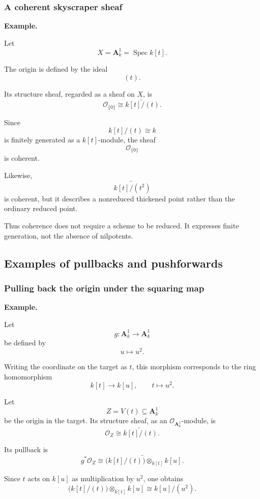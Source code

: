 \subsubsection{A coherent skyscraper sheaf}

\textbf{Example.}

Let
\[
X=\mathbf A^1_k=\operatorname{Spec}k[t].
\]

The origin is defined by the ideal
\[
(t).
\]

Its structure sheaf, regarded as a sheaf on \(X\), is
\[
\mathcal O_{\{0\}}
\cong
\widetilde{k[t]/(t)}.
\]

Since
\[
k[t]/(t)\cong k
\]
is finitely generated as a \(k[t]\)-module, the sheaf
\[
\mathcal O_{\{0\}}
\]
is coherent.

Likewise,
\[
\widetilde{k[t]/(t^2)}
\]
is coherent, but it describes a nonreduced thickened point rather than the ordinary reduced point.

Thus coherence does not require a scheme to be reduced. It expresses finite generation, not the absence of nilpotents.

\subsection{Examples of pullbacks and pushforwards}

\subsubsection{Pulling back the origin under the squaring map}

\textbf{Example.}

Let
\[
g:\mathbf A^1_k\longrightarrow\mathbf A^1_k
\]
be defined by
\[
u\longmapsto u^2.
\]

Writing the coordinate on the target as \(t\), this morphism corresponds to the ring homomorphism
\[
k[t]\longrightarrow k[u],
\qquad
t\longmapsto u^2.
\]

Let
\[
Z=V(t)\subseteq\mathbf A^1_k
\]
be the origin in the target. Its structure sheaf, as an \(\mathcal O_{\mathbf A^1_k}\)-module, is
\[
\mathcal O_Z\cong\widetilde{k[t]/(t)}.
\]

Its pullback is
\[
g^*\mathcal O_Z
\cong
\widetilde{
	\bigl(k[t]/(t)\bigr)\otimes_{k[t]}k[u]
}.
\]

Since \(t\) acts on \(k[u]\) as multiplication by \(u^2\), one obtains
\[
\bigl(k[t]/(t)\bigr)\otimes_{k[t]}k[u]
\cong
k[u]/(u^2).
\]

